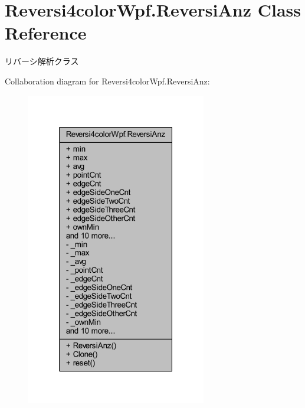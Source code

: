 \hypertarget{class_reversi4color_wpf_1_1_reversi_anz}{}\section{Reversi4color\+Wpf.\+Reversi\+Anz Class Reference}
\label{class_reversi4color_wpf_1_1_reversi_anz}


リバーシ解析クラス  




Collaboration diagram for Reversi4color\+Wpf.\+Reversi\+Anz\+:
\nopagebreak
\begin{figure}[H]
\begin{center}
\leavevmode
\includegraphics[width=223pt]{class_reversi4color_wpf_1_1_reversi_anz__coll__graph}
\end{center}
\end{figure}
